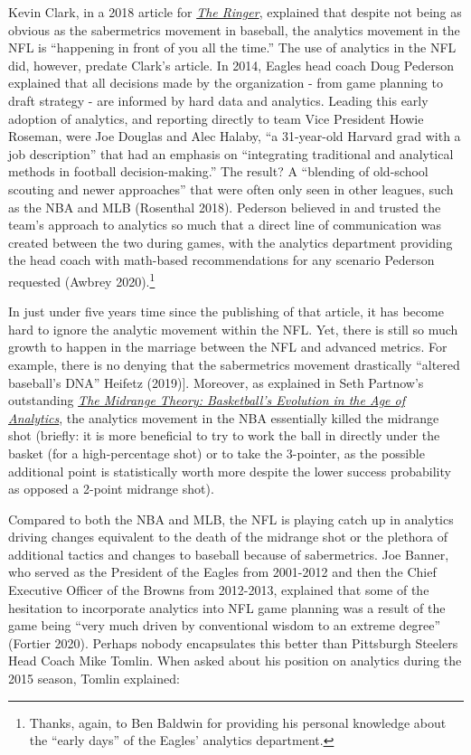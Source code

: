 \documentclass[
  letterpaper,
]{krantz}
\begin{document}
Kevin Clark, in a 2018 article for
\href{https://www.theringer.com/nfl/2018/12/19/18148153/nfl-analytics-revolution}{\emph{The
Ringer}}, explained that despite not being as obvious as the
sabermetrics movement in baseball, the analytics movement in the NFL is
``happening in front of you all the time.'' The use of analytics in the
NFL did, however, predate Clark's article. In 2014, Eagles head coach
Doug Pederson explained that all decisions made by the organization -
from game planning to draft strategy - are informed by hard data and
analytics. Leading this early adoption of analytics, and reporting
directly to team Vice President Howie Roseman, were Joe Douglas and Alec
Halaby, ``a 31-year-old Harvard grad with a job description'' that had
an emphasis on ``integrating traditional and analytical methods in
football decision-making.'' The result? A ``blending of old-school
scouting and newer approaches'' that were often only seen in other
leagues, such as the NBA and MLB (Rosenthal 2018). Pederson believed in
and trusted the team's approach to analytics so much that a direct line
of communication was created between the two during games, with the
analytics department providing the head coach with math-based
recommendations for any scenario Pederson requested (Awbrey
2020).\footnote{Thanks, again, to Ben Baldwin for providing his personal
  knowledge about the ``early days'' of the Eagles' analytics
  department.}

In just under five years time since the publishing of that article, it
has become hard to ignore the analytic movement within the NFL. Yet,
there is still so much growth to happen in the marriage between the NFL
and advanced metrics. For example, there is no denying that the
sabermetrics movement drastically ``altered baseball's DNA'' Heifetz
(2019){]}. Moreover, as explained in Seth Partnow's outstanding
\href{https://www.amazon.com/Midrange-Theory-Basketballs-Evolution-Analytics/dp/1637270968/ref=tmm_pap_swatch_0?_encoding=UTF8\&qid=1656245879\&sr=8-4}{\emph{The
Midrange Theory: Basketball's Evolution in the Age of Analytics}}, the
analytics movement in the NBA essentially killed the midrange shot
(briefly: it is more beneficial to try to work the ball in directly
under the basket (for a high-percentage shot) or to take the 3-pointer,
as the possible additional point is statistically worth more despite the
lower success probability as opposed a 2-point midrange shot).

Compared to both the NBA and MLB, the NFL is playing catch up in
analytics driving changes equivalent to the death of the midrange shot
or the plethora of additional tactics and changes to baseball because of
sabermetrics. Joe Banner, who served as the President of the Eagles from
2001-2012 and then the Chief Executive Officer of the Browns from
2012-2013, explained that some of the hesitation to incorporate
analytics into NFL game planning was a result of the game being ``very
much driven by conventional wisdom to an extreme degree'' (Fortier
2020). Perhaps nobody encapsulates this better than Pittsburgh Steelers
Head Coach Mike Tomlin. When asked about his position on analytics
during the 2015 season, Tomlin explained:
\end{document}
